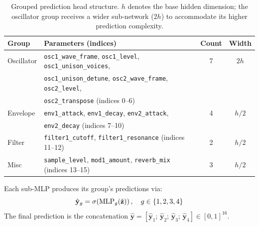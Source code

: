 \begin{table}[H]
\centering
\renewcommand{\arraystretch}{1.3}
\begin{tabular}{llcc}
\hline
\textbf{Group} & \textbf{Parameters (indices)} & \textbf{Count} & \textbf{Width} \\
\hline
Oscillator & \texttt{osc1\_wave\_frame}, \texttt{osc1\_level}, \texttt{osc1\_unison\_voices}, & 7 & $2h$ \\
           & \texttt{osc1\_unison\_detune}, \texttt{osc2\_wave\_frame}, \texttt{osc2\_level}, & & \\
           & \texttt{osc2\_transpose} \hspace{0.2em}(indices 0–6) & & \\
Envelope   & \texttt{env1\_attack}, \texttt{env1\_decay}, \texttt{env2\_attack},   & 4 & $h/2$ \\
           & \texttt{env2\_decay} \hspace{0.2em}(indices 7–10)                     & & \\
Filter     & \texttt{filter1\_cutoff}, \texttt{filter1\_resonance} \hspace{0.2em}(indices 11–12) & 2 & $h/2$ \\
Misc       & \texttt{sample\_level}, \texttt{mod1\_amount}, \texttt{reverb\_mix} \hspace{0.2em}(indices 13–15) & 3 & $h/2$ \\
\hline
\end{tabular}
\vspace{0.3cm}
\caption{Grouped prediction head structure. $h$ denotes the base hidden dimension; the oscillator group receives a wider sub-network ($2h$) to accommodate its higher prediction complexity.}
\label{tab:grouped_head}
\end{table}

\noindent Each sub-MLP produces its group's predictions via:
\begin{equation}
    \hat{\mathbf{y}}_g = \sigma\!\left(\text{MLP}_g(\tilde{\mathbf{z}})\right), \quad g \in \{1, 2, 3, 4\}
    \label{eq:grouped_head}\eqname{Grouped prediction head output}
\end{equation}
The final prediction is the concatenation $\hat{\mathbf{y}} = [\hat{\mathbf{y}}_1;\, \hat{\mathbf{y}}_2;\, \hat{\mathbf{y}}_3;\, \hat{\mathbf{y}}_4] \in [0,1]^{16}$.

